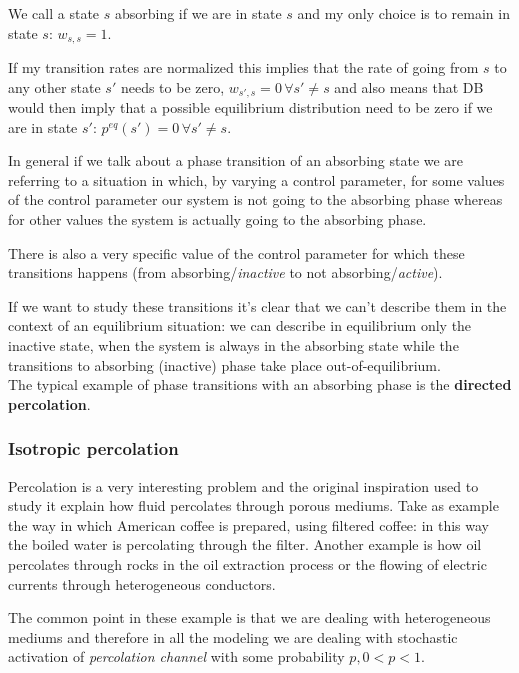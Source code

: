 \documentclass[\main/main.tex]{subfiles}
\begin{document}
We call a state $s$ absorbing if we are in state $s$ and my only choice is to remain in state $s$: $w_{s,s}=1$.

If my transition rates are normalized this implies that the rate of going from $s$ to any other state $s'$ needs to be zero, $w_{s',s}=0\,\forall s'\neq s$ and also means that DB would then imply that a possible equilibrium distribution need to be zero if we are in state $s'$: $p^{eq}(s')=0\,\forall s'\neq s$.

In general if we talk about a phase transition of an absorbing state we are referring to a situation in which, by varying a control parameter, for some values of the control parameter our system is not going to the absorbing phase whereas for other values the system is actually going to the absorbing phase.

There is also a very specific value of the control parameter for which these transitions happens (from absorbing/\textit{inactive} to not absorbing/\textit{active}).

If we want to study these transitions it's clear that we can't describe them in the context of an equilibrium situation: we can describe in equilibrium only the inactive state, when the system is always in the absorbing state while the transitions to absorbing (inactive) phase take place out-of-equilibrium. \\

The typical example of phase transitions with an absorbing phase is the \textbf{directed percolation}.

\subsubsection{Isotropic percolation}

Percolation is a very interesting problem and the original inspiration used to study it explain how fluid percolates through porous mediums. Take as example the way in which American coffee is prepared, using filtered coffee: in this way the boiled water is percolating through the filter. Another example is how oil percolates through rocks in the oil extraction process or the flowing of electric currents through heterogeneous conductors.

The common point in these example is that we are dealing with heterogeneous mediums and therefore in all the modeling we are dealing with stochastic activation of \textit{percolation channel} with some probability $p, 0<p<1$. \\
\end{document}
